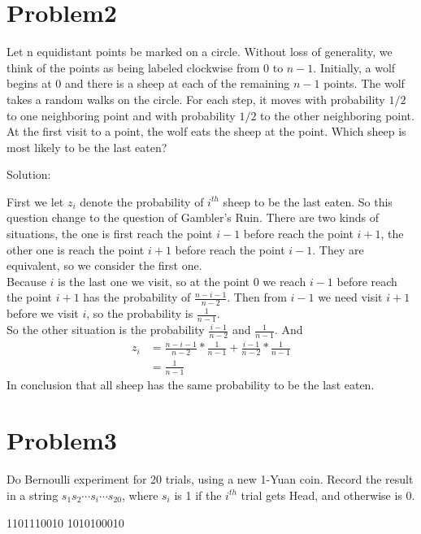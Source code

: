 \documentclass[12pt]{article}
\begin{document}
\section{Problem2}
Let n equidistant points be marked on a circle. Without loss of generality, we think of the points as being labeled clockwise from 0 to $n - 1$. Initially, a wolf begins at 0 and there is a sheep at each of the remaining $n - 1$ points. The wolf takes a random walks on the circle. For each step, it moves with probability $1/2$ to one neighboring point and with probability $1/2$ to the other neighboring point. At the first visit to a point, the wolf eats the sheep at the point. Which sheep is most likely to be the last eaten?

Solution:

First we let $z_i$ denote the probability of $i^{th}$ sheep to be the last eaten. So this question change to the question of Gambler's Ruin. There are two kinds of situations, the one is first reach the point $i-1$ before reach the point $i+1$, the other one is reach the point $i+1$ before reach the point $i-1$. They are equivalent, so we consider the first one.\\
Because $i$ is the last one we visit, so at the point 0 we reach $i-1$ before reach the point $i+1$ has the probability of $\frac{n-i-1}{n-2}$. Then from $i-1$ we need visit $i+1$ before we visit $i$, so the probability is $\frac{1}{n-1}$.\\
So the other situation is the probability $\frac{i-1}{n-2}$ and $\frac{1}{n-1}$. And
\begin{equation}
    \begin{split}
    z_i & = \frac{n-i-1}{n-2}*\frac{1}{n-1} + \frac{i-1}{n-2}*\frac{1}{n-1}\\
    &= \frac{1}{n-1}
    \end{split}
\end{equation}
In conclusion that all sheep has the same probability to be the last eaten.

\section{Problem3}
Do Bernoulli experiment for 20 trials, using a new 1-Yuan coin. Record the result in a
string $s_1s_2 \cdots s_i \cdots s_{20}$, where $s_i$ is 1 if the $i^{th}$ trial gets Head, and otherwise is 0.

1101110010 1010100010
\end{document}

